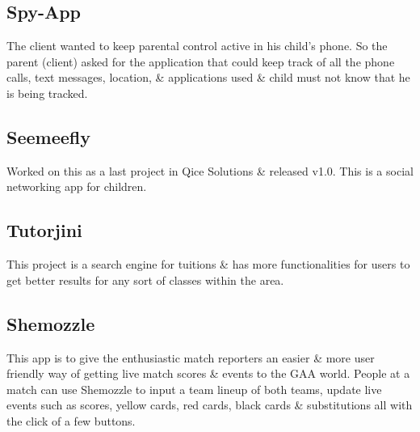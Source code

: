 \documentclass[]{deedy-resume-openfont}
\begin{document}
\begin{minipage}[t]{0.99\textwidth}
\subsection{Spy-App}
The client wanted to keep parental control active in his child’s phone. So the parent (client) asked for the application that could keep track of all the phone calls, text messages, location, \& applications used \& child must not know that he is being tracked.
\sectionsep


\subsection{Seemeefly}
Worked on this as a last project in Qice Solutions \& released v1.0. This is a social networking app for children.
\sectionsep


\subsection{Tutorjini}
This project is a search engine for tuitions \& has more functionalities for users to get better results for any sort of classes within the area.
\sectionsep

\subsection{Shemozzle}
This app is to give the enthusiastic match reporters an easier \& more user friendly way of getting live match scores \& events to the GAA world. People at a match can use Shemozzle to input a team lineup of both teams, update live events such as scores, yellow cards, red cards, black cards \& substitutions all with the click of a few buttons.
\sectionsep

\end{minipage} 
\end{document}
